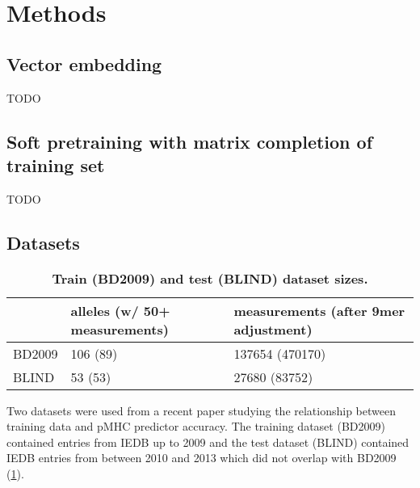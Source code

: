 \section*{Methods}
\subsection*{Vector embedding}
TODO

\subsection*{Soft pretraining with matrix completion of training set}
TODO


\subsection*{Datasets}
\begin{table}
\label {tab:datasets}
\begin{tabular}{lll}
\toprule
{} & alleles (w/ 50+ measurements) & measurements (after 9mer adjustment) \\
\midrule
BD2009 &                      106 (89) &                      137654 (470170) \\
BLIND  &                       53 (53) &                        27680 (83752) \\
\bottomrule
\end{tabular}
\caption{\textbf{Train (BD2009) and test (BLIND) dataset sizes.}}
\end{table}

Two datasets were used from a recent paper studying the relationship between training data and pMHC predictor accuracy\cite{Kim_2014}. The training dataset (BD2009) contained entries from IEDB\cite{Salimi_2012} up to 2009 and the test dataset (BLIND) contained IEDB entries from between 2010 and 2013 which did not overlap with BD2009 (\ref{tab:datasets}).


